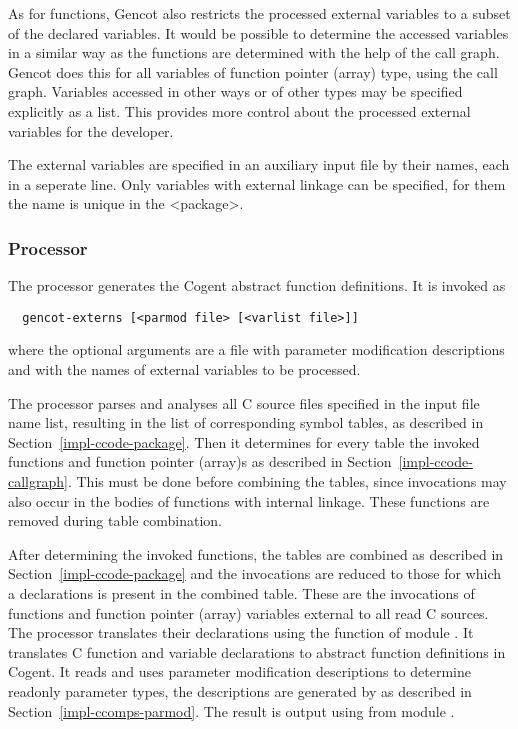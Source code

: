 As for functions, Gencot also restricts the processed external variables to a subset of the declared variables.
It would be possible to determine the accessed variables in a similar way as the functions are determined with
the help of the call graph. Gencot does this for all variables of function pointer (array) type, using the 
call graph. Variables accessed in other ways or of other types may be specified explicitly as a list. This
provides more control about the processed external variables for the developer.

The external variables are specified in an auxiliary input file by their names, each in a seperate line. Only
variables with external linkage can be specified, for them the name is unique in the <package>.

\subsubsection{Processor }

The processor  generates the Cogent abstract function definitions. It is invoked as
\begin{verbatim}
  gencot-externs [<parmod file> [<varlist file>]]
\end{verbatim}
where the optional arguments are a file with parameter modification descriptions and with the names of external
variables to be processed.

The processor parses and analyses
all C source files specified in the input file name list, resulting in the list of corresponding symbol tables, as
described in Section~\ref{impl-ccode-package}. Then
it determines for every table the invoked functions and function pointer (array)s as described in 
Section~\ref{impl-ccode-callgraph}. This must
be done before combining the tables, since invocations may also occur in the bodies of functions with internal
linkage. These functions are removed during table combination.

After determining the invoked functions, the tables are combined as described in Section~\ref{impl-ccode-package}
and the invocations are reduced to those for
which a declarations is present in the combined table. These are the invocations of functions and function
pointer (array) variables external to all
read C sources. The processor translates their declarations using the function  of
module . It translates C function and variable declarations to abstract function 
definitions
in Cogent. It reads and uses parameter modification descriptions to determine readonly parameter types, the
descriptions are generated by  as described in Section~\ref{impl-ccomps-parmod}.
The result is output using  from module .


